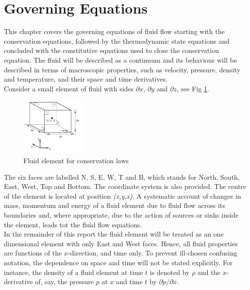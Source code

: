 \newpage
\section{Governing Equations}\label{sec3}
This chapter covers the governing equations of fluid flow starting with the conservation equations, followed by the thermodynamic state equations and concluded with the constitutive equations used to close the conservation equation. The fluid will be described as a continuum and its behaviour will be described in terms of macroscopic properties, such as velocity, pressure, density and temperature, and their space and time derivatives.\\ 

Consider a small element of fluid with sides $\partial x$, $\partial y$ and $\partial z$, see Fig \ref{fig5}. 

\begin{figure}[H]
	\centering
	\includegraphics[width =0.3\textwidth]{Images/fig5.png}
	\caption{Fluid element for conservation laws \cite{Versteeg2007}}		
	\label{fig5}
\end{figure}
The six faces are labelled N, S, E, W, T and B, which stands for North, South, East, West, Top and Bottom. The coordinate system is also provided. The centre of the element is located at position \textit{(x,y,x)}. A systematic account of changes in mass, momentum and energy of a fluid element due to fluid flow across its boundaries and, where appropriate, due to the action of sources or sinks inside the element, leads tot the fluid flow equations. \cite{Versteeg2007} \\

In the remainder of this report the fluid element will be treated as an one dimensional element with only East and West faces. Hence, all fluid properties are functions of the $x$-direction, and time only. To prevent ill-chosen confusing notation, the dependence on space and time will not be stated explicitly. For instance, the density of a fluid element at time $t$ is denoted by $\rho$ and the $x$-derivative of, say, the pressure  $p$ at $x$ and time $t$ by $\partial p/\partial x$.

